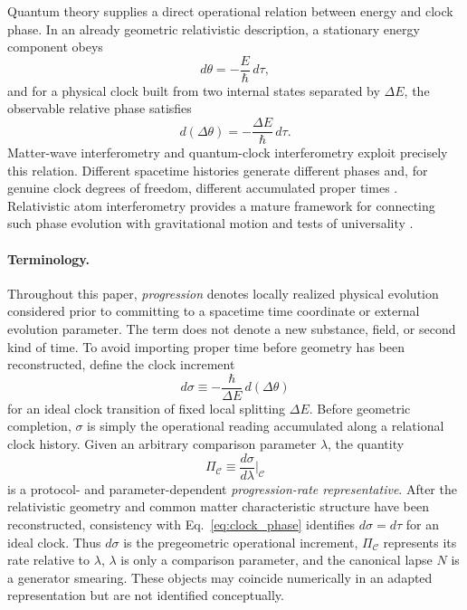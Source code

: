\documentclass[11pt]{article}
\begin{document}
Quantum theory supplies a direct operational relation between energy and clock phase. In an already geometric relativistic description, a stationary energy component obeys
\begin{equation}
    d\theta=-\frac{E}{\hbar}\,d\tau,
    \label{eq:phase_proper}
\end{equation}
and for a physical clock built from two internal states separated by $\Delta E$, the observable relative phase satisfies
\begin{equation}
    d(\Delta\theta)=-\frac{\Delta E}{\hbar}\,d\tau.
    \label{eq:clock_phase}
\end{equation}
Matter-wave interferometry and quantum-clock interferometry exploit precisely this relation. Different spacetime histories generate different phases and, for genuine clock degrees of freedom, different accumulated proper times \cite{Stodolsky1979,Zych2011,Roura2020,Roura2021}. Relativistic atom interferometry provides a mature framework for connecting such phase evolution with gravitational motion and tests of universality \cite{Dimopoulos2008,Ufrecht2020}.

\paragraph{Terminology.}
Throughout this paper, \emph{progression} denotes locally realized physical evolution considered prior to committing to a spacetime time coordinate or external evolution parameter. The term does not denote a new substance, field, or second kind of time. To avoid importing proper time before geometry has been reconstructed, define the clock increment
\begin{equation}
    \boxed{d\sigma\equiv-\frac{\hbar}{\Delta E}\,d(\Delta\theta)}
    \label{eq:sigma_clock}
\end{equation}
for an ideal clock transition of fixed local splitting $\Delta E$. Before geometric completion, $\sigma$ is simply the operational reading accumulated along a relational clock history. Given an arbitrary comparison parameter $\lambda$, the quantity
\begin{equation}
    \Pi_{\mathcal C}\equiv\frac{d\sigma}{d\lambda}\bigg|_{\mathcal C}
\end{equation}
is a protocol- and parameter-dependent \emph{progression-rate representative}. After the relativistic geometry and common matter characteristic structure have been reconstructed, consistency with Eq.~\eqref{eq:clock_phase} identifies $d\sigma=d\tau$ for an ideal clock. Thus $d\sigma$ is the pregeometric operational increment, $\Pi_{\mathcal C}$ represents its rate relative to $\lambda$, $\lambda$ is only a comparison parameter, and the canonical lapse $N$ is a generator smearing. These objects may coincide numerically in an adapted representation but are not identified conceptually.
\end{document}
